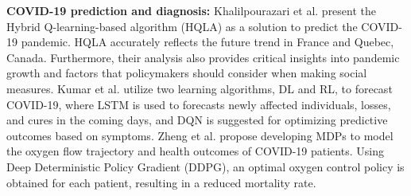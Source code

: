 \documentclass[acmsmall]{acmart}
\begin{document}
\textbf{COVID-19 prediction and diagnosis: }
Khalilpourazari et al. \cite{9551174, Khalilpourazari2022} present the Hybrid Q-learning-based algorithm (HQLA) as a solution to predict the COVID-19 pandemic. HQLA accurately reflects the future trend in France and Quebec, Canada. Furthermore, their analysis also provides critical insights into pandemic growth and factors that policymakers should consider when making social measures. 
Kumar et al. \cite{10.3389/fpubh.2021.744100} utilize two learning algorithms, DL and RL, to forecast COVID-19, where LSTM is used to forecasts newly affected individuals, losses, and cures in the coming days, and DQN is suggested for optimizing predictive outcomes based on symptoms.
Zheng et al. \cite{Zheng2021} propose developing MDPs to model the oxygen flow trajectory and health outcomes of COVID-19 patients. Using Deep Deterministic Policy Gradient (DDPG), an optimal oxygen control policy is obtained for each patient, resulting in a reduced mortality rate.
\end{document}
